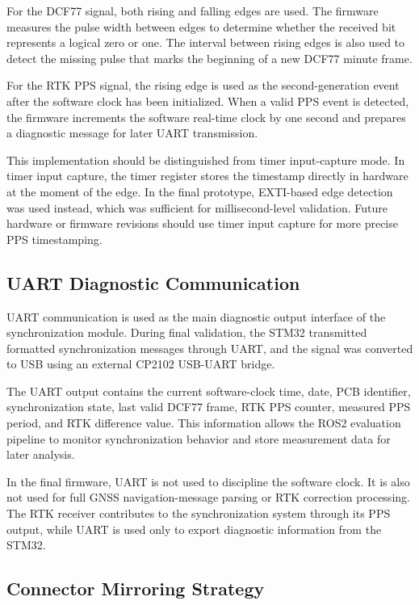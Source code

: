 For the DCF77 signal, both rising and falling edges are used. The firmware measures the pulse width between edges to determine whether the received bit represents a logical zero or one. The interval between rising edges is also used to detect the missing pulse that marks the beginning of a new DCF77 minute frame.

For the RTK PPS signal, the rising edge is used as the second-generation event after the software clock has been initialized. When a valid PPS event is detected, the firmware increments the software real-time clock by one second and prepares a diagnostic message for later UART transmission.

This implementation should be distinguished from timer input-capture mode. In timer input capture, the timer register stores the timestamp directly in hardware at the moment of the edge. In the final prototype, EXTI-based edge detection was used instead, which was sufficient for millisecond-level validation. Future hardware or firmware revisions should use timer input capture for more precise PPS timestamping.

\subsection{UART Diagnostic Communication}

UART communication is used as the main diagnostic output interface of the synchronization module. During final validation, the STM32 transmitted formatted synchronization messages through UART, and the signal was converted to USB using an external CP2102 USB-UART bridge.

The UART output contains the current software-clock time, date, PCB identifier, synchronization state, last valid DCF77 frame, RTK PPS counter, measured PPS period, and RTK difference value. This information allows the ROS2 evaluation pipeline to monitor synchronization behavior and store measurement data for later analysis.

In the final firmware, UART is not used to discipline the software clock. It is also not used for full GNSS navigation-message parsing or RTK correction processing. The RTK receiver contributes to the synchronization system through its PPS output, while UART is used only to export diagnostic information from the STM32.

\subsection{Connector Mirroring Strategy}


